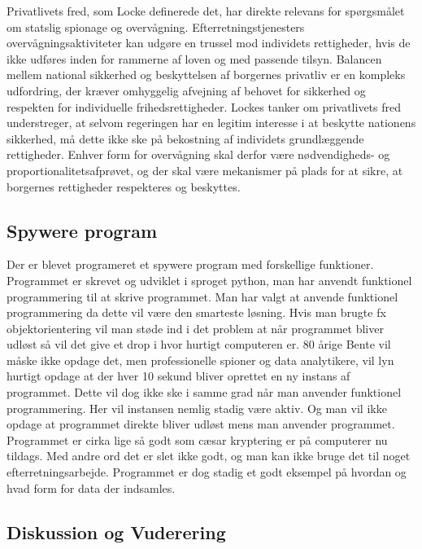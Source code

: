 Privatlivets fred, som Locke definerede det, har direkte relevans for spørgsmålet om statslig spionage og overvågning. Efterretningstjenesters overvågningsaktiviteter kan udgøre en trussel mod individets rettigheder, hvis de ikke udføres inden for rammerne af loven og med passende tilsyn. Balancen mellem national sikkerhed og beskyttelsen af borgernes privatliv er en kompleks udfordring, der kræver omhyggelig afvejning af behovet for sikkerhed og respekten for individuelle frihedsrettigheder. Lockes tanker om privatlivets fred understreger, at selvom regeringen har en legitim interesse i at beskytte nationens sikkerhed, må dette ikke ske på bekostning af individets grundlæggende rettigheder. Enhver form for overvågning skal derfor være nødvendigheds- og proportionalitetsafprøvet, og der skal være mekanismer på plads for at sikre, at borgernes rettigheder respekteres og beskyttes.

\subsection{Spywere program}
Der er blevet programeret et spywere program med forskellige funktioner. Programmet er skrevet og udviklet i sproget python, man har anvendt funktionel programmering til at skrive programmet. Man har valgt at anvende funktionel programmering da dette vil være den smarteste løsning. Hvis man brugte fx objektorientering vil man støde ind i det problem at når programmet bliver udløst så vil det give et drop i hvor hurtigt computeren er. 80 årige Bente vil måske ikke opdage det, men professionelle spioner og data analytikere, vil lyn hurtigt opdage at der hver 10 sekund bliver oprettet en ny instans af programmet. Dette vil dog ikke ske i samme grad når man anvender funktionel programmering. Her vil instansen nemlig stadig være aktiv. Og man vil ikke opdage at programmet direkte bliver udløst mens man anvender programmet. Programmet er cirka lige så godt som cæsar kryptering er på computerer nu tildags. Med andre ord det er slet ikke godt, og man kan ikke bruge det til noget efterretningsarbejde. Programmet er dog stadig et godt eksempel på hvordan og hvad form for data der indsamles. 

\newpage
\subsection{Diskussion og Vuderering}



\newpage